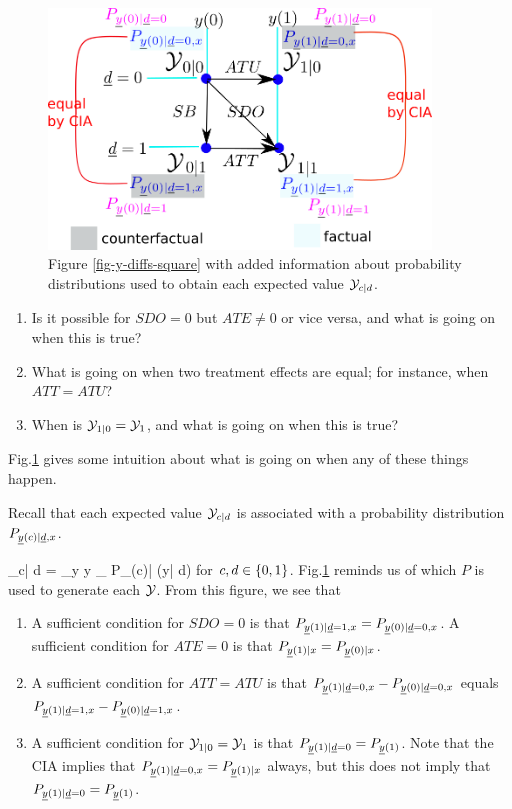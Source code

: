 \begin{figure}[h!]
\centering
\includegraphics[width=4in]
{pot-out/y-diffs-square-probs.png}
\caption{Figure \ref{fig-y-diffs-square} 
with added information
about  probability distributions 
used to obtain each expected value
 ${\cal Y}_{c| d }$.}
\label{fig-y-diffs-square-probs}
\end{figure}


\begin{enumerate}
\item 
Is it
possible for $SDO=0$ but $ATE\neq 0$
or vice versa, and
what is going on when this is true?
\item
What is going on when two treatment effects
are equal; for instance, when $ATT=ATU$?
\item
When is ${\cal Y}_{1|0}={\cal Y}_{1}$,
and what is going on when this is  true?
\end{enumerate}
Fig.\ref{fig-y-diffs-square-probs}
gives some 
intuition 
about what is
going on when any of these 
things happen.

Recall that
each expected value
${\cal Y}_{c|d}$ 
is associated with a probability
distribution $P_{{\underline{y}}(c)|{\underline{d}},x}$.

\beq
\caly_{c| d }
=
\sum_{y} y 
_{
P_{\rvy(c)| \rvd}(y| d)}
\eeq
for $c,  d\in \{0,1\}$.
Fig.\ref{fig-y-diffs-square-probs}
reminds us of which $P$
is used to generate each ${\cal Y}$.
From this figure, we see that

\begin{enumerate}
\item
A sufficient
condition for $SDO=0$
is that 
$P_{{\underline{y}}(1)| {\underline{d}}=1,x}
=
P_{{\underline{y}}(0)| {\underline{d}}=0,x}$.
A sufficient
condition for $ATE=0$
is that 
$P_{{\underline{y}}(1)|x}
=
P_{{\underline{y}}(0)|x}$.

\item
A sufficient condition for
$ATT=ATU$
is that 
$P_{{\underline{y}}(1)| {\underline{d}}=0,x}
-
P_{{\underline{y}}(0)| {\underline{d}}=0,x}$
equals
$P_{{\underline{y}}(1)| {\underline{d}}=1,x}
-
P_{{\underline{y}}(0)| {\underline{d}}=1,x}$.
\item
A sufficient condition for ${\cal Y}_{1|0}={\cal Y}_{1}$
is that
$P_{{\underline{y}}(1)| {\underline{d}}=0}=
P_{{\underline{y}}(1)}$. Note that
the CIA implies that 
$P_{{\underline{y}}(1)| {\underline{d}}=0,x}=
P_{{\underline{y}}(1)|x}$ always,
but this does not imply that
$P_{{\underline{y}}(1)| {\underline{d}}=0}=
P_{{\underline{y}}(1)}$.
\end{enumerate}


